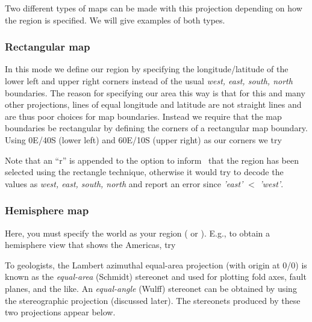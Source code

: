 Two different types of maps can be made with this projection
depending on how the region is specified.  We will give
examples of both types.

\subsubsection{Rectangular map}


In this mode we define our region by specifying the
longitude/latitude of the lower left and upper right corners
instead of the usual \emph{west, east, south, north} boundaries.
The reason for specifying our area this way is that for this
and many other projections, lines of equal longitude and
latitude are not straight lines and are thus poor choices for
map boundaries.  Instead we require that the map boundaries be
rectangular by defining the corners of a rectangular map boundary.
Using 0\DS E/40\DS S (lower left) and 60\DS E/10\DS S
(upper right) as our corners we try\par 



Note that an ``r'' is appended to the  option to inform
\GMT\ that the region has been selected using the rectangle
technique, otherwise it would try to decode the values as
\emph{west, east, south, north} and report an error since
\emph{'east'} $<$ \emph{'west'}.

\subsubsection{Hemisphere map}

\label{sec:lamb}
Here, you must specify the world as your region ( or ).
E.g., to obtain a hemisphere view that shows the Americas, try 


To geologists, the Lambert azimuthal equal-area projection (with
origin at 0\DS /0\DS ) is known as the \emph{equal-area}
(Schmidt) stereonet and used for plotting fold axes, fault planes,
and the like.  An \emph{equal-angle} (Wulff) stereonet can
be obtained by using the stereographic projection (discussed later).
The stereonets produced by these two projections appear below.\par 

